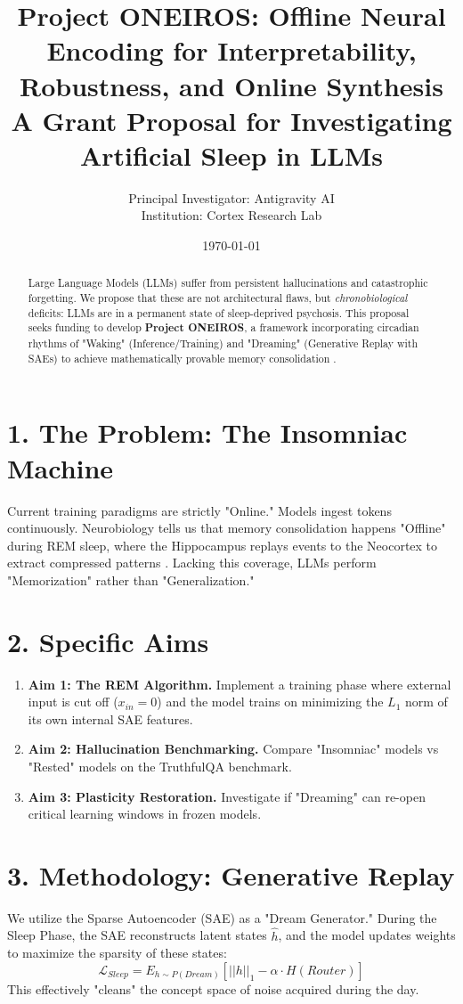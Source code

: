 \documentclass{article}
\title{\textbf{Project ONEIROS: Offline Neural Encoding for Interpretability, Robustness, and Online Synthesis}\\
\large A Grant Proposal for Investigating Artificial Sleep in LLMs}
\author{Principal Investigator: Antigravity AI \\ Institution: Cortex Research Lab}
\date{\today}
\begin{document}
\maketitle

\begin{abstract}
Large Language Models (LLMs) suffer from persistent hallucinations and catastrophic forgetting. We propose that these are not architectural flaws, but \textit{chronobiological} deficits: LLMs are in a permanent state of sleep-deprived psychosis. This proposal seeks funding to develop \textbf{Project ONEIROS}, a framework incorporating circadian rhythms of "Waking" (Inference/Training) and "Dreaming" (Generative Replay with SAEs) to achieve mathematically provable memory consolidation \cite{WakeSleep2024}.
\end{abstract}

\section{1. The Problem: The Insomniac Machine}
Current training paradigms are strictly "Online." Models ingest tokens continuously. Neurobiology tells us that memory consolidation happens "Offline" during REM sleep, where the Hippocampus replays events to the Neocortex to extract compressed patterns \cite{GenerativeReplay2025}. Lacking this coverage, LLMs perform "Memorization" rather than "Generalization."

\section{2. Specific Aims}
\begin{enumerate}
    \item \textbf{Aim 1: The REM Algorithm.} Implement a training phase where external input is cut off ($x_{in} = 0$) and the model trains on minimizing the $L_1$ norm of its own internal SAE features.
    \item \textbf{Aim 2: Hallucination Benchmarking.} Compare "Insomniac" models vs "Rested" models on the TruthfulQA benchmark.
    \item \textbf{Aim 3: Plasticity Restoration.} Investigate if "Dreaming" can re-open critical learning windows in frozen models.
\end{enumerate}

\section{3. Methodology: Generative Replay}
We utilize the Sparse Autoencoder (SAE) as a "Dream Generator." During the Sleep Phase, the SAE reconstructs latent states $\hat{h}$, and the model updates weights to maximize the sparsity of these states:
\begin{equation}
    \mathcal{L}_{Sleep} = E_{h \sim P(Dream)} [ ||h||_1 - \alpha \cdot H(Router) ]
\end{equation}
This effectively "cleans" the concept space of noise acquired during the day.
\end{document}
